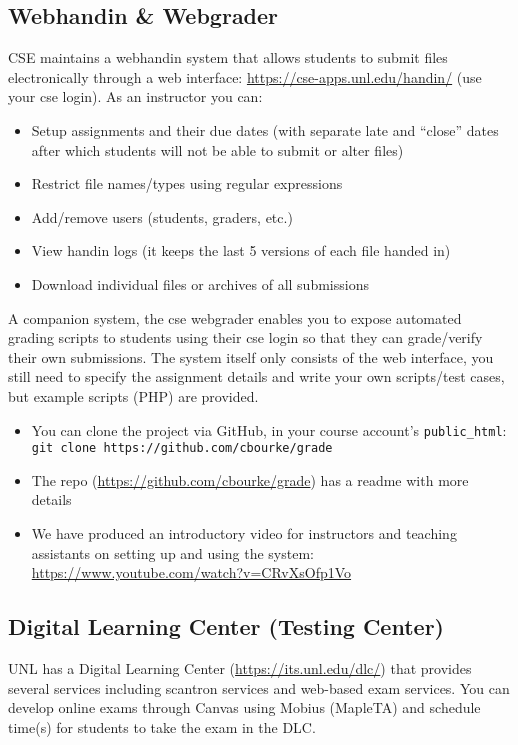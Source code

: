 \documentclass[12pt]{scrartcl}
\begin{document}
\subsection{Webhandin \& Webgrader}

CSE maintains a webhandin system that allows students to submit
files electronically through a web interface: \url{https://cse-apps.unl.edu/handin/} (use your cse login).  As an instructor you
can:
\begin{itemize}
  \item Setup assignments and their due dates (with separate late
and ``close'' dates after which students will not be able to
submit or alter files)
  \item Restrict file names/types using regular expressions
  \item Add/remove users (students, graders, etc.)
  \item View handin logs (it keeps the last 5 versions of
  each file handed in)
  \item Download individual files or archives of all submissions
\end{itemize}

A companion system, the cse webgrader enables you to expose
automated grading scripts to students using their cse login so
that they can grade/verify their own submissions.  The system
itself only consists of the web interface, you still need to
specify the assignment details and write your own scripts/test
cases, but example scripts (PHP) are provided.

\begin{itemize}
  \item You can clone the project via GitHub, in your course
  account's \texttt{public_html}: 
   \texttt{git clone https://github.com/cbourke/grade}
  \item The repo (\url{https://github.com/cbourke/grade}) has a
  readme with more details
  \item We have produced an introductory video for instructors 
  and teaching assistants on setting up and using the system:
  \url{https://www.youtube.com/watch?v=CRvXsOfp1Vo}
\end{itemize}

\subsection{Digital Learning Center (Testing Center)}

UNL has a Digital Learning Center (\url{https://its.unl.edu/dlc/})
that provides several services including scantron services and 
web-based exam services.  You can develop online exams through
Canvas using Mobius (MapleTA) and schedule time(s) for students
to take the exam in the DLC.  
\end{document}
